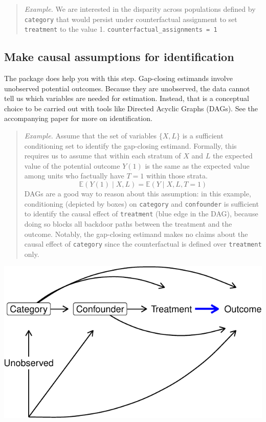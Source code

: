 \documentclass[
]{article}
\begin{document}
\begin{quote}
\emph{Example.} We are interested in the disparity across populations defined by \texttt{category} that would persist under counterfactual assignment to set \texttt{treatment} to the value 1.
\texttt{counterfactual\_assignments\ =\ 1}
\end{quote}

\subsection{Make causal assumptions for identification}\label{make-causal-assumptions-for-identification}

The package does help you with this step. Gap-closing estimands involve unobserved potential outcomes. Because they are unobserved, the data cannot tell us which variables are needed for estimation. Instead, that is a conceptual choice to be carried out with tools like Directed Acyclic Graphs (DAGs). See the accompanying \citet{lundberg2021} paper for more on identification.

\begin{quote}
\emph{Example.} Assume that the set of variables \(\{X,L\}\) is a sufficient conditioning set to identify the gap-closing estimand. Formally, this requires us to assume that within each stratum of \(X\) and \(L\) the expected value of the potential outcome \(Y(1)\) is the same as the expected value among units who factually have \(T = 1\) within those strata.
\[\mathbb{E}(Y(1)\mid X, L) = \mathbb{E}(Y\mid X, L, T = 1)\]
DAGs are a good way to reason about this assumption: in this example, conditioning (depicted by boxes) on \texttt{category} and \texttt{confounder} is sufficient to identify the causal effect of \texttt{treatment} (blue edge in the DAG), because doing so blocks all backdoor paths between the treatment and the outcome. Notably, the gap-closing estimand makes no claims about the causal effect of \texttt{category} since the counterfactual is defined over \texttt{treatment} only.
\end{quote}

\includegraphics{github_doc_files/figure-latex/unnamed-chunk-18-1.pdf}
\end{document}
